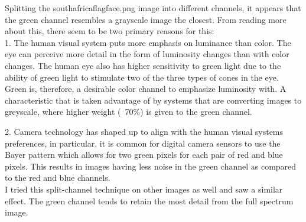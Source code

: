Splitting the southafricaflagface.png image into different channels, it appears that the green channel resembles a grayscale image the closest. From reading more about this, there seem to be two primary reasons for this:\\

1. The human visual system puts more emphasis on luminance than color. The eye can perceive more detail in the form of luminosity changes than with color changes. The human eye also has higher sensitivity to green light due to the ability of green light to stimulate two of the three types of cones in the eye. Green is, therefore, a desirable color channel to emphasize luminosity with. A characteristic that is taken advantage of by systems that are converting images to greyscale, where higher weight (~70\%) is given to the green channel.

2. Camera technology has shaped up to align with the human visual systems preferences, in particular, it is common for digital camera sensors to use the Bayer pattern which allows for two green pixels for each pair of red and blue pixels. This results in images having less noise in the green channel as compared to the red and blue channels.\\

I tried this split-channel technique on other images as well and saw a similar effect. The green channel tends to retain the most detail from the full spectrum image.